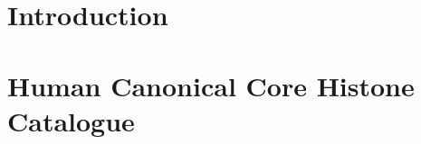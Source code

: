 \documentclass[a4paper,twoside,openright,draft]{memoir}
\begin{document}
  \mainmatter

  \chapter{Introduction}

  

  \chapter{Human Canonical Core Histone Catalogue}
  \label{ch:histone-catalogue}
  \begingroup
  \newcommand{\ResultsDir}{results-homo-sapiens}
  \newcommand{\FigsDir}{figs-homo-sapiens}
  \newcommand{\ReferenceDir}{data/reference-homo-sapiens}
  \endgroup

  
  

  
  

  \backmatter

  
\end{document}
